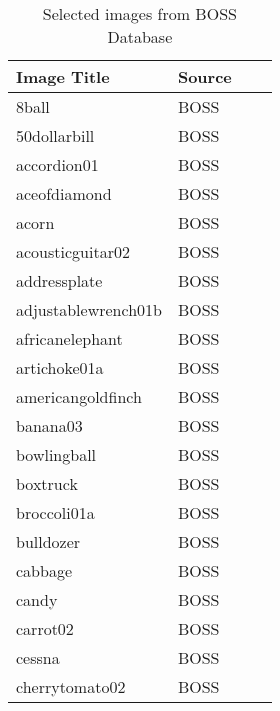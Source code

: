 \begin{table}[t!]
	\begin{tabular}{llll}
		\hline
		Image Title & Source	\\ [2ex] 
		\hline
		8ball    	& BOSS		\\ [0.5ex]
		50dollarbill    	& BOSS		\\ [0.5ex]
		accordion01    	& BOSS		\\ [0.5ex]
		aceofdiamond    	& BOSS		\\ [0.5ex]
		acorn    	& BOSS		\\ [0.5ex]
		acousticguitar02    	& BOSS		\\ [0.5ex]
		addressplate    	& BOSS		\\ [0.5ex]
		adjustablewrench01b    	& BOSS		\\ [0.5ex]
		africanelephant    	& BOSS		\\ [0.5ex]
		artichoke01a    	& BOSS		\\ [0.5ex]
		americangoldfinch    	& BOSS		\\ [0.5ex]
		banana03    	& BOSS		\\ [0.5ex]
		bowlingball    	& BOSS		\\ [0.5ex]
		boxtruck    	& BOSS		\\ [0.5ex]
		broccoli01a    	& BOSS		\\ [0.5ex]
		bulldozer    	& BOSS		\\ [0.5ex]
		cabbage    	& BOSS		\\ [0.5ex]
		candy    	& BOSS		\\ [0.5ex]
		carrot02    	& BOSS		\\ [0.5ex]
		cessna    	& BOSS		\\ [0.5ex]
		cherrytomato02    	& BOSS		\\ [0.5ex]
		 \hline
	\end{tabular}
	\caption{Selected images from BOSS Database}
	\label{table:boss-words}
\end{table}

